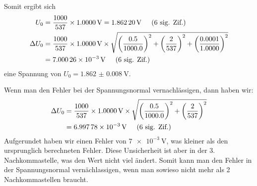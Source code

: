 		Somit ergibt sich
		\begin{align}
			U_0 &= \frac{\num{1000}}{\num{537}}\times\SI{1.0000}{\volt} = \SI{1.86220}{\volt} \hspace{0.5cm}\text{(6 sig. Zif.)} \\
			\Delta U_0 &= \frac{\num{1000}}{\num{537}}\times\SI{1.0000}{\volt} \times \sqrt{\left(\frac{0.5}{\num{1000.0}}\right)^2 + \left(\frac{2}{\num{537}}\right)^2 + \left(\frac{0.0001}{\num{1.0000}}\right)^2} \notag \\
			&= \SI{7.00026e-3}{\volt} \hspace{0.5cm}\text{(6 sig. Zif.)}
		\end{align}
		eine Spannung von $U_0 = \SI{1.862(8)}{\volt}$.

		Wenn man den Fehler bei der Spannungsnormal vernachlässigen, dann haben wir:
		\begin{align}
			\Delta U_0 &= \frac{\num{1000}}{\num{537}}\times\SI{1.0000}{\volt} \times \sqrt{\left(\frac{0.5}{\num{1000.0}}\right)^2 + \left(\frac{2}{\num{537}}\right)^2} \notag \\
			&= \SI{6.99778e-3}{\volt} \hspace{0.5cm}\text{(6 sig. Zif.)}
		\end{align}
		Aufgerundet haben wir einen Fehler von $\SI{7e-3}{\volt}$, was kleiner als den ursprunglich berechneten Fehler. Diese Unsicherheit ist aber in der 3. Nachkommastelle, was den Wert nicht viel ändert. Somit kann man den Fehler in der Spannungsnormal vernächlassigen, wenn man sowieso nicht mehr als 2 Nachkommastellen braucht. 

